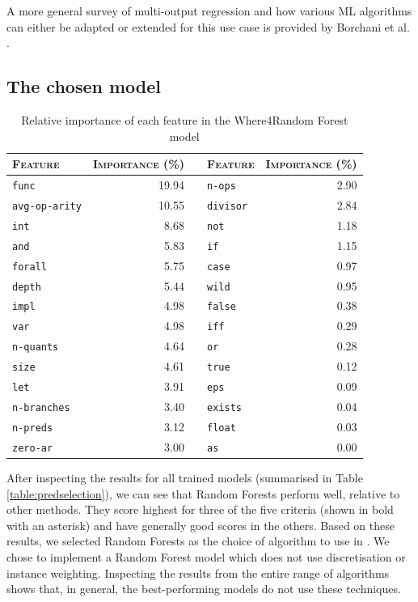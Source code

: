 A more general survey of multi-output regression and how various ML algorithms can either be adapted or extended for this use case is provided by Borchani et al. \cite{multisurvey}.

\subsection{The chosen model}
\label{sec:chosen}


\begin{table}
	\caption[Relative importance of features for \where]{Relative importance of each feature in the \textsf{Where4}Random Forest model}
	
	
	\begin{tabularx}{\textwidth}{@{}lr|c|lr@{}}
		\toprule
		\textsc{Feature} & \textsc{Importance (\%)} & & 
		\textsc{Feature} & \textsc{Importance (\%)}  \\
		\midrule
		\texttt{func} & 19.94 & & \texttt{n-ops} & 2.90 \\
		\texttt{avg-op-arity} &  10.55 & & \texttt{divisor} & 2.84 \\
		\texttt{int} & 8.68 & & \texttt{not} & 1.18 \\
		\texttt{and} & 5.83 & & \texttt{if} & 1.15 \\
		\texttt{forall} & 5.75 & & \texttt{case} & 0.97 \\
		\texttt{depth} & 5.44 & & \texttt{wild} & 0.95 \\
		\texttt{impl} & 4.98 & & \texttt{false} & 0.38 \\
		\texttt{var} & 4.98 & & \texttt{iff} & 0.29 \\
		\texttt{n-quants} & 4.64 & & \texttt{or} & 0.28 \\
		\texttt{size} & 4.61 & & \texttt{true} & 0.12 \\
		\texttt{let} & 3.91 & & \texttt{eps} & 0.09 \\
		\texttt{n-branches} & 3.40 & & \texttt{exists} & 0.04 \\
		\texttt{n-preds} & 3.12 & & \texttt{float} & 0.03 \\
		\texttt{zero-ar} & 3.00 & & \texttt{as} & 0.00 \\
		\bottomrule	
	\end{tabularx}
	\label{table:importances}
\end{table}


After inspecting the results for all trained models (summarised in Table \ref{table:predselection}), we can see that Random Forests \cite{RandomForests} perform well, relative to other methods. 
They score highest for three of the five criteria (shown in bold with an asterisk) and have generally good scores in the others.
Based on these results, we selected Random Forests as the choice of algorithm to use in \where.
We chose to implement a Random Forest model which does not use discretisation or instance weighting. 
Inspecting the results from the entire range of algorithms shows that, in general, the best-performing models do not use these techniques.


